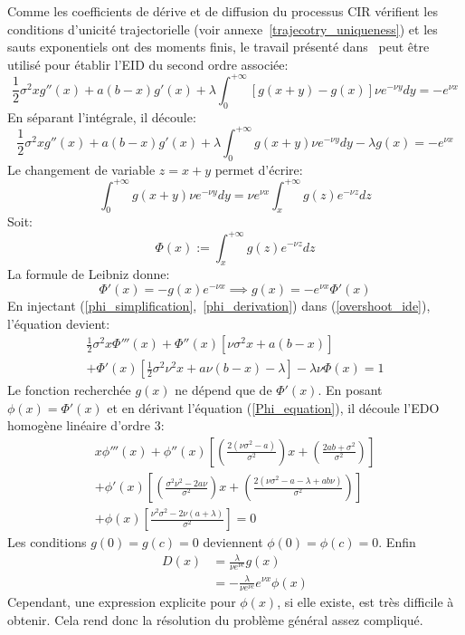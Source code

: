 Comme les coefficients de dérive et de diffusion du processus \acs{CIR} vérifient les conditions d'unicité trajectorielle (voir annexe~\ref{trajecotry_uniqueness}) et les sauts exponentiels ont des moments finis, le travail présenté dans~\cite{abundo2013} peut être utilisé pour établir l'\acs{EID} du second ordre associée:
\begin{equation}\label{initial_overshoot_ide}
    \frac{1}{2}\sigma^2xg''(x)+a(b-x)g'(x)+\lambda\int_0^{+\infty}\left[g(x+y)-g(x)\right]\nu e^{-\nu y}dy=-e^{\nu x}
\end{equation}
En séparant l'intégrale, il découle:
\begin{equation}\label{overshoot_ide}
        \frac{1}{2}\sigma^2xg''(x)+a(b-x)g'(x)+\lambda\int_0^{+\infty}g(x+y)\nu e^{-\nu y}dy-\lambda g(x)=-e^{\nu x}
\end{equation}
Le changement de variable $z=x+y$ permet d'écrire:
\[
\int_0^{+\infty}g(x+y)\nu e^{-\nu y}dy=\nu e^{\nu x}\int_x^{+\infty}g(z)e^{-\nu z}dz
\]
Soit:
\begin{equation}\label{phi_simplification}
    \Phi(x):=\int_x^{+\infty}g(z)e^{-\nu z}dz
\end{equation}
La formule de Leibniz donne:
\begin{equation}\label{phi_derivation}
        \Phi'(x)=-g(x)e^{-\nu x}\implies g(x)=-e^{\nu x}\Phi'(x)
\end{equation}
En injectant (\ref{phi_simplification},~\ref{phi_derivation}) dans (\ref{overshoot_ide}), l'équation devient:
\begin{equation}\label{Phi_equation}
    \begin{aligned}
        \frac{1}{2}\sigma^2x\Phi'''(x)+\Phi''(x)\left[\nu\sigma^2x+a(b-x)\right]\\+\Phi'(x)\left[\frac{1}{2}\sigma^2\nu^2x+a\nu(b-x)-\lambda\right]-\lambda\nu \Phi(x)=1
    \end{aligned}
\end{equation}
Le fonction recherchée $g(x)$ ne dépend que de $\Phi'(x)$. En posant $\phi(x)=\Phi'(x)$ et en dérivant l'équation (\ref{Phi_equation}), il découle l'\acs{EDO} homogène linéaire d'ordre 3:
\begin{equation}\label{phi_equation}
    \begin{aligned}
        x \phi'''(x)+\phi''(x) \left[\left(\frac{2(\nu\sigma^2-a)}{\sigma^2}\right)x+\left(\frac{2ab+\sigma^2}{\sigma^2}\right)\right]\\+\phi'(x) \left[\left(\frac{\sigma^2\nu^2-2a\nu}{\sigma^2}\right)x+\left(\frac{2(\nu\sigma^2-a-\lambda+ab\nu)}{\sigma^2}\right)\right]\\+\phi(x) \left[\frac{\nu^2  \sigma ^2-2\nu(a+\lambda )}{\sigma^2}\right]=0
    \end{aligned}
\end{equation}
Les conditions $g(0)=g(c)=0$ deviennent $\phi(0)=\phi(c)=0$. Enfin
\[
\begin{aligned}
    D(x) &= \frac{\lambda}{\nu e^{\nu c}}g(x)\\
    &=-\frac{\lambda}{\nu e^{\nu c}}e^{\nu x}\phi(x)
\end{aligned}
\]
Cependant, une expression explicite pour $\phi(x)$, si elle existe, est très difficile à obtenir. Cela rend donc la résolution du problème général assez compliqué. 

